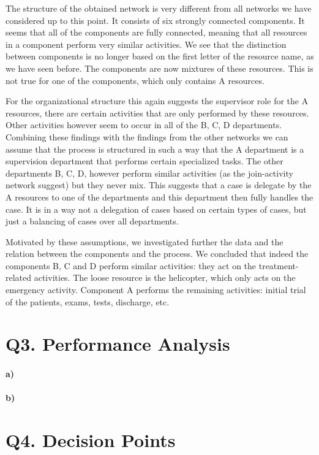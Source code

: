 \documentclass[12pt]{report}
\begin{document}
The structure of the obtained network is very different from all networks we have considered up to this point. It consists of six strongly connected components. It seems that all of the components are fully connected, meaning that all resources in a component perform very similar activities. We see that the distinction between components is no longer based on the first letter of the resource name, as we have seen before. The components are now mixtures of these resources. This is not true for one of the components, which only contains A resources.

For the organizational structure this again suggests the supervisor role for the A resources, there are certain activities that are only performed by these resources. Other activities however seem to occur in all of the B, C, D departments. Combining these findings with the findings from the other networks we can assume that the process is structured in such a way that the A department is a supervision department that performs certain specialized tasks. The other departments B, C, D, however perform similar activities (as the join-activity network suggest) but they never mix. This suggests that a case is delegate by the A resources to one of the departments and this department then fully handles the case. It is in a way not a delegation of cases based on certain types of cases, but just a balancing of cases over all departments.

Motivated by these assumptions, we investigated further the data and the relation between the components and the process. We concluded that indeed the components B, C and D perform similar activities: they act on the treatment-related activities. The loose resource is the helicopter, which only acts on the emergency activity. Component A performs the remaining activities: initial trial of the patients, exams, tests, discharge, etc.

\section{Q3. Performance Analysis}
\paragraph{a)} 
\paragraph{b)}

\section{Q4. Decision Points}
\end{document}
